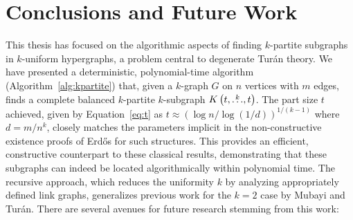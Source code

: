 \section{Conclusions and Future Work}\label{sec:conclusions}

This thesis has focused on the algorithmic aspects of finding $k$-partite subgraphs in $k$-uniform hypergraphs,
a problem central to degenerate Turán theory.
We have presented a deterministic,
polynomial-time algorithm (Algorithm~\ref{alg:kpartite}) that, given a $k$-graph $G$ on $n$ vertices with $m$ edges,
finds a complete balanced $k$-partite $k$-subgraph $K\left(t, \overset{k}{\dots}, t\right)$.
The part size $t$ achieved, given by Equation~\eqref{eq:t} as $t \approx (\log n / \log(1/d))^{1/(k-1)}$ where $d=m/n^k$,
closely matches the parameters implicit in the non-constructive existence proofs of Erd\H{o}s for such structures.
This provides an efficient, constructive counterpart to these classical results,
demonstrating that these subgraphs can indeed be located algorithmically within polynomial time.
The recursive approach, which reduces the uniformity $k$ by analyzing appropriately defined link graphs,
generalizes previous work for the $k=2$
case by Mubayi and Turán.
There are several avenues for future research stemming from this work:

